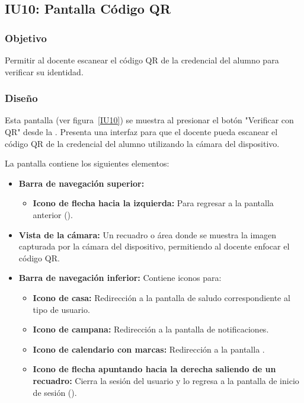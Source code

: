 \subsection{IU10: Pantalla Código QR}

\newpage

\subsubsection{Objetivo}
Permitir al docente escanear el código QR de la credencial del alumno para verificar su identidad.

\subsubsection{Diseño}
Esta pantalla  (ver figura~\ref{IU10}) se muestra al presionar el botón "Verificar con QR"  desde la . Presenta una interfaz para que el docente pueda escanear el código QR de la credencial del alumno utilizando la cámara del dispositivo.



La pantalla contiene los siguientes elementos:
\begin{itemize}
	\item \textbf{Barra de navegación superior:}
	\begin{itemize}
		\item \textbf{Icono de flecha hacia la izquierda:} Para regresar a la pantalla anterior ().
	\end{itemize}
	\item \textbf{Vista de la cámara:} Un recuadro o área donde se muestra la imagen capturada por la cámara del dispositivo, permitiendo al docente enfocar el código QR.
	\item \textbf{Barra de navegación inferior:} Contiene iconos para:
	\begin{itemize}
		\item \textbf{Icono de casa:} Redirección a la pantalla de saludo correspondiente al tipo de usuario.
		\item \textbf{Icono de campana:} Redirección a la pantalla de notificaciones.
		\item \textbf{Icono de calendario con marcas:} Redirección a la pantalla .
		\item \textbf{Icono de flecha apuntando hacia la derecha saliendo de un recuadro:} Cierra la sesión del usuario y lo regresa a la pantalla de inicio de sesión ().
	\end{itemize}
\end{itemize}

